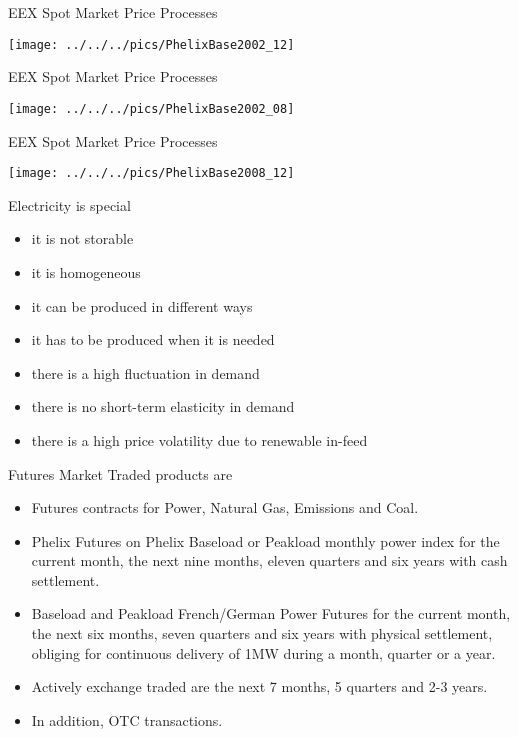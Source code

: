 {EEX Spot Market Price Processes}

\texttt{[image: ../../../pics/PhelixBase2002\_12]}

{EEX Spot Market Price Processes}

\texttt{[image: ../../../pics/PhelixBase2002\_08]}

{EEX Spot Market Price Processes}

\texttt{[image: ../../../pics/PhelixBase2008\_12]}

{Electricity is special}
\begin{itemize}
\item<1-> it is not storable
\item<2-> it is homogeneous
\item<3-> it can be produced in different ways
\item<4-> it has to be produced when it is needed
\item<5-> there is a high fluctuation in demand
\item<6-> there is no short-term elasticity in demand
\item<7-> there is a high price volatility due to renewable in-feed
\end{itemize}


{Futures Market} Traded products are
\begin{itemize}
\item<1->Futures contracts for Power, Natural Gas, Emissions and Coal.
\item<2->Phelix Futures on Phelix Baseload or Peakload monthly power index for the current month, the next nine months, eleven quarters and six years with cash settlement.
\item<3-> Baseload and Peakload French/German Power Futures for the current month, the next six months, seven quarters and six years with physical settlement, obliging for continuous delivery of 1MW during a month, quarter or a year.
\item<4-> Actively exchange traded are the next 7 months, 5 quarters and 2-3 years.
\item<5-> In addition, OTC transactions.
\end{itemize}

